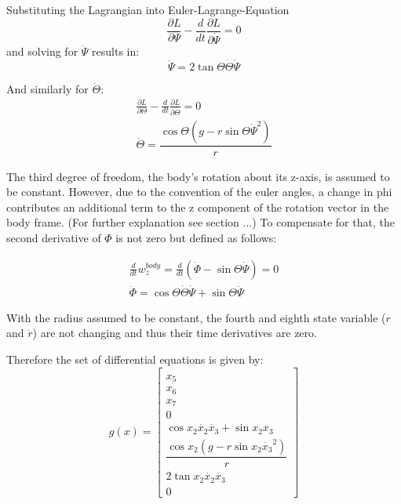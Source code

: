 Substituting the Lagrangian into Euler-Lagrange-Equation 
\begin{equation} \frac{\partial L}{\partial \Psi}-\frac{d}{dt}\frac{\partial L}{\partial \dot{\Psi}}=0 \end{equation}
and solving for $\ddot{\Psi}$ results in:
\begin{equation} \ddot{\Psi}=2\tan{\Theta}\dot{\Theta}\dot{\Psi} \end{equation}

And similarly for $\ddot{\Theta}$:
\begin{eqnarray} \frac{\partial L}{\partial \Theta}-\frac{d}{dt}\frac{\partial L}{\partial \dot{\Theta}}=0 \\
 \ddot{\Theta}=\dfrac{\cos{\Theta}(g-r\sin{\Theta}\dot{\Psi}^2)}{r} \end{eqnarray}

The third degree of freedom, the body's rotation about its z-axis, is assumed to be constant. However, due to the convention of the euler angles, a change in phi contributes an additional term to the z component of the rotation vector in the body frame. (For further explanation see section ...) To compensate for that, the second derivative of $\Phi$ is not zero but defined as follows: 

\begin{eqnarray} \frac{d}{dt}w_{z}^{body}=\frac{d}{dt}(\dot{\Phi} - \sin{\Theta} \dot{\Psi}) =0 \\
 \ddot{\Phi}=\cos{\Theta}\dot{\Theta}\dot{\Psi}+\sin{\Theta}\ddot{\Psi} \end{eqnarray}

With the radius assumed to be constant, the fourth and eighth state variable ($r$ and $\dot{r}$) are not changing and thus their time derivatives are zero.

Therefore the set of differential equations is given by:
\begin{equation} g(x)=\begin{bmatrix} \\ x_{5} \\ x_{6} \\ x_{7} \\ 0 \\ \cos{x_{2}} \dot{x_{2}} \dot{x_{3}}+\sin{x_{2}} \ddot{x_{3}} \\  \dfrac{\cos{x_{2}}(g-r\sin{x_{2}} \dot{x_{3}}^2)}{r} \\ 2\tan{x_{2}} \dot{x_{2}} \dot{x_{3}} \\ 0  \end{bmatrix} \end{equation}

